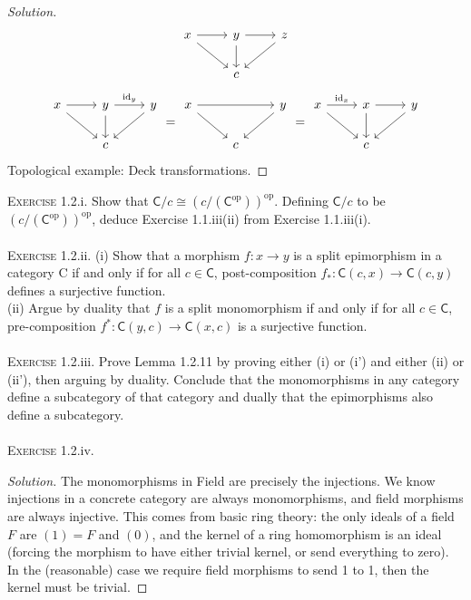 \documentclass{article}
\newcommand{\cat}[1]{\textsf{#1}}
\newenvironment{solution}{\begin{proof}[Solution]}{\end{proof}}
\begin{document}
\begin{solution}
\begin{equation*}
\begin{tikzcd}
                    x \arrow[dr] \arrow[r] & y \arrow[d] \arrow[r] & z \arrow[dl] \\
            & c 
        \end{tikzcd}
    \end{equation*}
    \begin{equation*}
        \begin{tikzcd}
                    x \arrow[dr] \arrow[r] & y \arrow[r, "\text{id}_y"] \arrow[d] & y \arrow[dl] \\
            & c 
        \end{tikzcd}
        =
        \begin{tikzcd}
        x  \arrow[rr] \arrow[dr]&& y \arrow[dl]\\ 
            & c 
        \end{tikzcd}
        =
        \begin{tikzcd}
                    x \arrow[dr] \arrow[r, "\text{id}_x"] & x \arrow[r] \arrow[d] & y \arrow[dl] \\
            & c 
        \end{tikzcd}
    \end{equation*}
    Topological example: Deck transformations.
    \end{solution}
\noindent \textsc{Exercise} 1.2.i. Show that $\cat{C}/c \cong (c/(\cat{C}^{\text{op}}))^{\text{op}}$. Defining $\cat{C}/c$ to be $(c/(\cat{C}^{\text{op}}))^{\text{op}}$, deduce Exercise 1.1.iii(ii) from Exercise 1.1.iii(i).\\ \\
\textsc{Exercise} 1.2.ii. (i) Show that a morphism $f: x\to y$ is a split epimorphism in a category \cat{C} if and only if for all $c \in \cat{C}$, post-composition $f_*: \cat{C}(c,x) \to \cat{C}(c,y)$ defines a surjective function. \\
(ii) Argue by duality that $f$ is a split monomorphism if and only if for all $c \in \cat{C}$, pre-composition $f^*: \cat{C}(y,c) \to \cat{C}(x,c)$ is a surjective function. \\ \\
\textsc{Exercise} 1.2.iii. Prove Lemma 1.2.11 by proving either (i) or (i') and either (ii) or (ii'), then arguing by duality. Conclude that the monomorphisms in any category define a subcategory of that category and dually that the epimorphisms also define a subcategory. \\ \\
\textsc{Exercise} 1.2.iv. 
\begin{solution}
    The monomorphisms in \cat{Field} are precisely the injections. We know injections in a concrete category are always monomorphisms, and field morphisms are always injective. This comes from basic ring theory: the only ideals of a field $F$ are $(1) = F$ and $(0)$, and the kernel of a ring homomorphism is an ideal (forcing the morphism to have either trivial kernel, or send everything to zero). In the (reasonable) case we require field morphisms to send 1 to 1, then the kernel must be trivial.
\end{solution}
\end{document}
